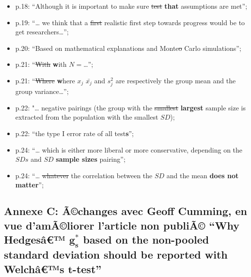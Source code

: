 \begin{appendix}
\begin{itemize}
\tightlist
\item
  p.18: ``Although it is important to make sure \sout{test}
  \textbf{that} assumptions are met'';\\
\item
  p.19: ``\ldots{} we think that a \sout{first} realistic first step
  towards progress would be to get researchers\ldots{}'';\\
\item
  p.20: ``Based on mathematical explanations and Monte\sout{o} Carlo
  simulations'';\\
\item
  p.21: ``\sout{With} \textbf{w}ith \(N=\)\ldots{}'';\\
\item
  p.21: ``\sout{Where} \textbf{w}here \sout{\(x_j\)} \(\bar{x_j}\) and
  \(s^2_j\) are respectively the group mean and the group
  variance\ldots{}'';\\
\item
  p.22: "\ldots{} negative pairings (the group with the \sout{smallest}
  \textbf{largest} sample size is extracted from the population with the
  smallest \(SD\));\\
\item
  p.22: ``the type I error rate of all test\textbf{s}'';\\
\item
  p.24: ``\ldots{} which is either more liberal or more conservative,
  depending on the \(SDs\) and \sout{\(SD\)} \textbf{sample sizes}
  pairing'';\\
\item
  p.24: ``\ldots{} \sout{whatever} the correlation between the \(SD\)
  and the mean \textbf{does not matter}'';
\end{itemize}

\newpage

\hypertarget{annexe-c-uxe3changes-avec-geoff-cumming-en-vue-damuxe3liorer-larticle-non-publiuxe3-why-hedgesuxe2-bmg_s-based-on-the-non-pooled-standard-deviation-should-be-reported-with-welchuxe2s-bmt-test}{%
\subsection{\texorpdfstring{Annexe C: Ã©changes avec Geoff Cumming, en
vue d'amÃ©liorer l'article non publiÃ© ``Why Hedgesâ€™ \(\bm{g_s^*}\)
based on the non-pooled standard deviation should be reported with
Welchâ€™s
\(\bm{t}\)-test''}{Annexe C: Ã©changes avec Geoff Cumming, en vue d'amÃ©liorer l'article non publiÃ© ``Why Hedgesâ€™ \textbackslash bm\{g\_s\^{}*\} based on the non-pooled standard deviation should be reported with Welchâ€™s \textbackslash bm\{t\}-test''}}\label{annexe-c-uxe3changes-avec-geoff-cumming-en-vue-damuxe3liorer-larticle-non-publiuxe3-why-hedgesuxe2-bmg_s-based-on-the-non-pooled-standard-deviation-should-be-reported-with-welchuxe2s-bmt-test}}


\end{appendix}
